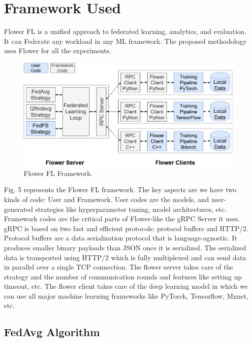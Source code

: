 \documentclass[conference]{IEEEtran}
\begin{document}
\section{Framework Used}

Flower FL \cite{beutel2020flower} is a unified approach to federated learning, analytics, and evaluation. It can Federate any workload in any ML framework. The proposed methodology uses Flower for all the experiments.
\begin{figure}[htp]
        \centering
        \includegraphics[scale=.25]{Images/flower-core-framework-architecture.png}
        \caption{Flower FL Framework.}
    \end{figure}
Fig. 5 represents the Flower FL framework. The key aspects are we have two kinds of code: User and Framework. User codes are the models, and user-generated strategies like hyperparameter tuning, model architectures, etc. Framework codes are the critical parts of Flower-like the gRPC Server it uses. gRPC is based on two fast and efficient protocols: protocol buffers and HTTP/2. Protocol buffers are a data serialization protocol that is language-agnostic. It produces smaller binary payloads than JSON once it is serialized. The serialized data is transported using HTTP/2 which is fully multiplexed and can send data in parallel over a single TCP connection. The flower server takes care of the strategy and the number of communication rounds and features like setting up timeout, etc. The flower client takes care of the deep learning model in which we can use all major machine learning frameworks like PyTorch, Tensorflow, Mxnet, etc.

\subsection{FedAvg Algorithm}
\end{document}
